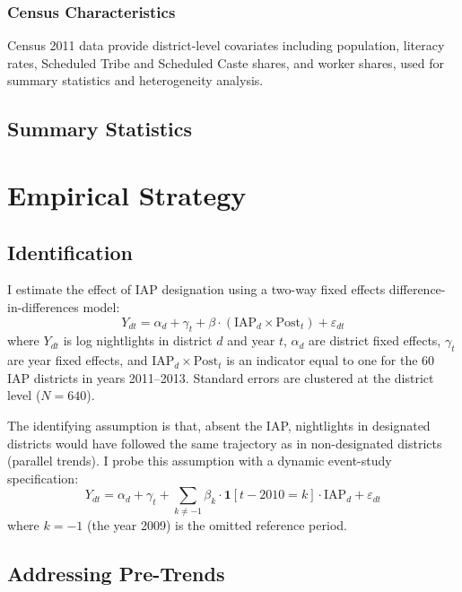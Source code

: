 \documentclass[12pt]{article}
\begin{document}
\subsubsection*{Census Characteristics} Census 2011 data provide district-level covariates including population, literacy rates, Scheduled Tribe and Scheduled Caste shares, and worker shares, used for summary statistics and heterogeneity analysis.

\subsection{Summary Statistics}



\section{Empirical Strategy}

\subsection{Identification}

I estimate the effect of IAP designation using a two-way fixed effects difference-in-differences model:
\begin{equation}
Y_{dt} = \alpha_d + \gamma_t + \beta \cdot (\text{IAP}_d \times \text{Post}_t) + \varepsilon_{dt}
\label{eq:did}
\end{equation}
where $Y_{dt}$ is log nightlights in district $d$ and year $t$, $\alpha_d$ are district fixed effects, $\gamma_t$ are year fixed effects, and $\text{IAP}_d \times \text{Post}_t$ is an indicator equal to one for the 60 IAP districts in years 2011--2013. Standard errors are clustered at the district level ($N = 640$).

The identifying assumption is that, absent the IAP, nightlights in designated districts would have followed the same trajectory as in non-designated districts (parallel trends). I probe this assumption with a dynamic event-study specification:
\begin{equation}
Y_{dt} = \alpha_d + \gamma_t + \sum_{k \neq -1} \beta_k \cdot \mathbf{1}[t - 2010 = k] \cdot \text{IAP}_d + \varepsilon_{dt}
\label{eq:event}
\end{equation}
where $k = -1$ (the year 2009) is the omitted reference period.

\subsection{Addressing Pre-Trends}
\end{document}
